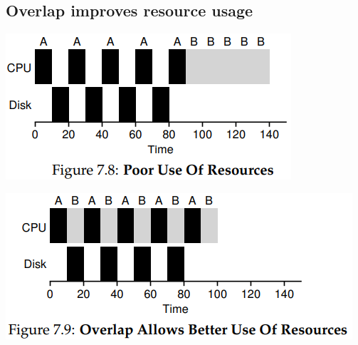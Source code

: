 \documentclass[8pt,a4paper,landscape]{extarticle}
\begin{document}
\begin{multicols*}{3}
\section*{Overlap improves resource usage}
\begin{minipage}{.45\linewidth}
  \includegraphics[width=\linewidth]{imgs/sched_io1}
\end{minipage}
\begin{minipage}{.55\linewidth}
  \includegraphics[width=\linewidth]{imgs/sched_io2}
\end{minipage}

\end{multicols*}
\end{document}

